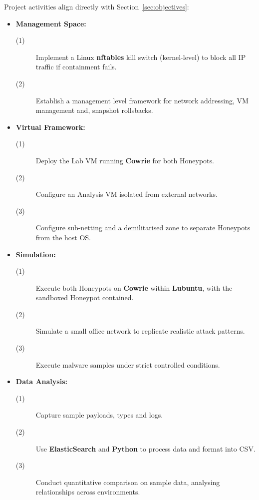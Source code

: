 \documentclass[a4paper,12pt,oneside]{book}			%
\begin{document}
Project activities align directly with Section~\ref{sec:objectives}:
\begin{itemize}
	\item\textbf{Management Space:}
		\begin{description}
			\item[(1)] Implement a Linux \textbf{nftables} kill switch (kernel-level) to block all IP traffic if containment fails.
			\item[(2)] Establish a management level framework for network addressing, VM management and, snapshot rollsbacks.
		\end{description}

	\item\textbf{Virtual Framework:}
		\begin{description}
			\item[(1)] Deploy the Lab VM running \textbf{Cowrie} for both Honeypots.
			\item[(2)] Configure an Analysis VM isolated from external networks.
			\item[(3)] Configure sub-netting and a demilitarised zone to separate Honeypots from the host OS.
			\end{description}

	\item\textbf{Simulation:}
		\begin{description}
			\item[(1)] Execute both Honeypots on \textbf{Cowrie} within \textbf{Lubuntu}, with the sandboxed Honeypot contained.
			\item[(2)] Simulate a small office network to replicate realistic attack patterns.
			\item[(3)] Execute malware samples under strict controlled conditions.
		\end{description}

	\item\textbf{Data Analysis:}
		\begin{description}
			\item[(1)] Capture sample payloads, types and logs.
			\item[(2)] Use \textbf{ElasticSearch} and \textbf{Python} to process data and format into CSV.
			\item[(3)] Conduct quantitative comparison on sample data, analysing relationships across environments.
		\end{description}

\end{itemize}
\end{document}
